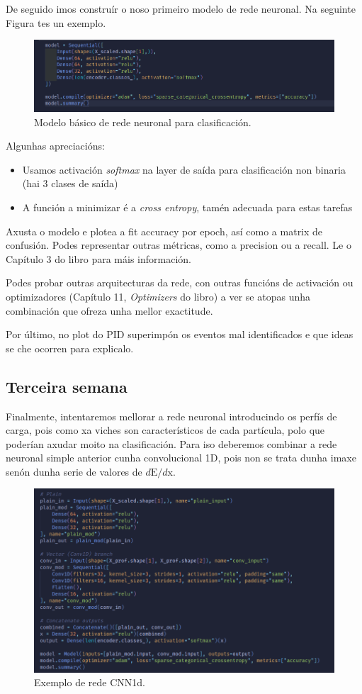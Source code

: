 \documentclass[11pt, a4paper]{article}
\begin{document}
De seguido imos construír o noso primeiro modelo de rede neuronal. Na seguinte Figura tes un exemplo.
\begin{figure}[!htb]
    \centering
    \includegraphics[width=0.8\linewidth]{figures/basic_model.png}
    \caption{Modelo básico de rede neuronal para clasificación.}
\end{figure}

Algunhas apreciacións:
\begin{itemize}
    \item Usamos activación \textit{softmax} na layer de saída para clasificación non binaria (hai 3 clases de saída)
    \item A función a minimizar é a \textit{cross entropy}, tamén adecuada para estas tarefas
\end{itemize}
Axusta o modelo e plotea a fit accuracy por epoch, así como a matrix de confusión. Podes representar outras métricas, como a precision ou a recall. Le o Capítulo 3 do libro para máis información.

Podes probar outras arquitecturas da rede, con outras funcións de activación ou optimizadores (Capítulo 11, \textit{Optimizers} do libro) a ver se atopas unha combinación que ofreza unha mellor exactitude.

Por último, no plot do PID superimpón os eventos mal identificados e que ideas se che ocorren para explicalo.

\subsection{Terceira semana}
Finalmente, intentaremos mellorar a rede neuronal introducindo os perfís de carga, pois como xa viches son característicos de cada partícula, polo que poderían axudar moito na clasificación. Para iso deberemos combinar a rede neuronal simple anterior cunha convolucional 1D, pois non se trata dunha imaxe senón dunha serie de valores de $d\text{E}/d\text{x}$.
\begin{figure}[!htb]
    \centering
    \includegraphics[width=0.8\linewidth]{figures/cnn_model.png}
    \caption{Exemplo de rede CNN1d.}
    \label{fig:cnn}
\end{figure}
\end{document}
